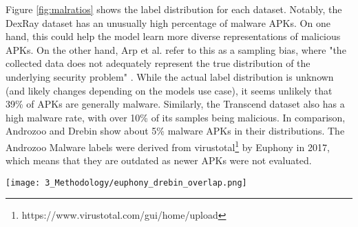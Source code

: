 Figure \ref{fig:malratios} shows the label distribution for each dataset. 
Notably, the DexRay dataset has an unusually high percentage of malware APKs. 
On one hand, this could help the model learn more diverse representations of malicious APKs. 
On the other hand, Arp et al. refer to this as a sampling bias, where 
"the collected data does not adequately represent the true distribution of 
the underlying security problem" \cite{dodo}. 
While the actual label distribution is unknown 
(and likely changes depending on the models use case), 
it seems unlikely that 39\% of APKs are generally malware. 
Similarly, the Transcend dataset also has a high malware rate, 
with over 10\% of its samples being malicious. 
In comparison, Androzoo and Drebin show about 5\% malware APKs in their distributions. 
The Androzoo Malware labels were derived from 
virustotal\footnote{https://www.virustotal.com/gui/home/upload} by 
Euphony \cite{androzoo_malware} in 2017, 
which means that they are outdated as newer APKs were not evaluated.

\begin{marginfigure}[-50pt] %
    \texttt{[image: 3\_Methodology/euphony\_drebin\_overlap.png]}
    \caption{\label{fig:euphony_drebin_overlap}
    Overlap between the Drebin and Euphony datasets. 
    The light blue circle represents Drebin, where 112,109 APKs are classified as goodware (excluding overlap).
    The red circle represents Euphony, which contains 1,316,025 APKs labeled as malware (excluding overlap). 
    The dark blue circle represent those 5560 APKs, that are considered malware for both Drebin and Euphony.
    The intersection in orange highlights 11,344 APKs classified as goodware by Drebin but as malware by Euphony.}
\end{marginfigure}

